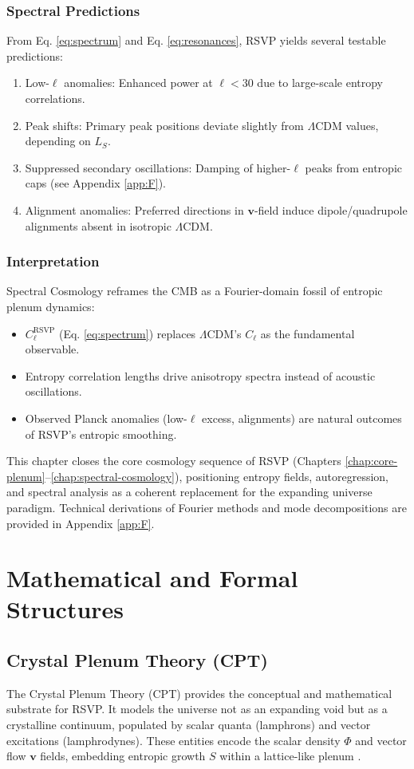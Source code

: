 \documentclass[12pt]{report}
\begin{document}
\section{Spectral Predictions}
From Eq. \eqref{eq:spectrum} and Eq. \eqref{eq:resonances}, RSVP yields several testable predictions:
\begin{enumerate}
    \item Low-\(\ell\) anomalies: Enhanced power at \(\ell < 30\) due to large-scale entropy correlations.
    \item Peak shifts: Primary peak positions deviate slightly from \(\Lambda\)CDM values, depending on \(L_S\).
    \item Suppressed secondary oscillations: Damping of higher-\(\ell\) peaks from entropic caps (see Appendix \ref{app:F}).
    \item Alignment anomalies: Preferred directions in \(\mathbf{v}\)-field induce dipole/quadrupole alignments absent in isotropic \(\Lambda\)CDM.
\end{enumerate}

\section{Interpretation}
Spectral Cosmology reframes the CMB as a Fourier-domain fossil of entropic plenum dynamics:
\begin{itemize}
    \item \(C_\ell^{\text{RSVP}}\) (Eq. \eqref{eq:spectrum}) replaces \(\Lambda\)CDM’s \(C_\ell\) as the fundamental observable.
    \item Entropy correlation lengths drive anisotropy spectra instead of acoustic oscillations.
    \item Observed Planck anomalies (low-\(\ell\) excess, alignments) are natural outcomes of RSVP’s entropic smoothing.
\end{itemize}
This chapter closes the core cosmology sequence of RSVP (Chapters \ref{chap:core-plenum}–\ref{chap:spectral-cosmology}), positioning entropy fields, autoregression, and spectral analysis as a coherent replacement for the expanding universe paradigm. Technical derivations of Fourier methods and mode decompositions are provided in Appendix \ref{app:F}.

\part{Mathematical and Formal Structures}

\chapter{Crystal Plenum Theory (CPT)}
\label{chap:cpt}
The Crystal Plenum Theory (CPT) provides the conceptual and mathematical substrate for RSVP. It models the universe not as an expanding void but as a crystalline continuum, populated by scalar quanta (lamphrons) and vector excitations (lamphrodynes). These entities encode the scalar density \(\Phi\) and vector flow \(\mathbf{v}\) fields, embedding entropic growth \(S\) within a lattice-like plenum \citep{Flyxion2025}.
\end{document}

